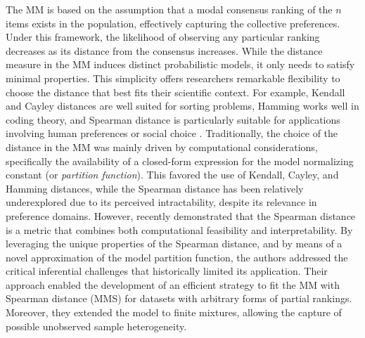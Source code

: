 The MM is based on the assumption that a modal consensus ranking of the $n$ items exists in the population, effectively capturing the collective preferences. Under this framework, the likelihood of observing any particular ranking decreases as its distance from the consensus increases.
{While the distance measure in the MM induces distinct probabilistic models, it only needs to satisfy minimal properties. This simplicity offers researchers remarkable flexibility to choose the distance that best fits their scientific context. For example, Kendall and Cayley distances are well suited for sorting problems, Hamming works well in coding theory, and Spearman distance is particularly suitable for applications involving human preferences or social choice \citep{Diaconis1988}.}
Traditionally, the choice of the distance in the MM was mainly driven by computational considerations, specifically the availability of a closed-form expression for the model normalizing constant (or \textit{partition function}). This favored the use of Kendall, Cayley, and Hamming distances, while the Spearman distance has been relatively underexplored due to its perceived intractability, despite its relevance in preference domains. However, \citet{crispino23efficient} recently demonstrated that the Spearman distance is a metric that combines both computational feasibility and interpretability. By leveraging the unique properties of the Spearman distance, and by means of a novel approximation of the model partition function, the authors addressed the critical inferential challenges that historically limited its application. Their approach enabled the development of an efficient strategy to fit the MM with Spearman distance (MMS) for datasets with arbitrary forms of partial rankings. Moreover, they extended the model to finite mixtures, allowing the capture of possible unobserved sample heterogeneity.


